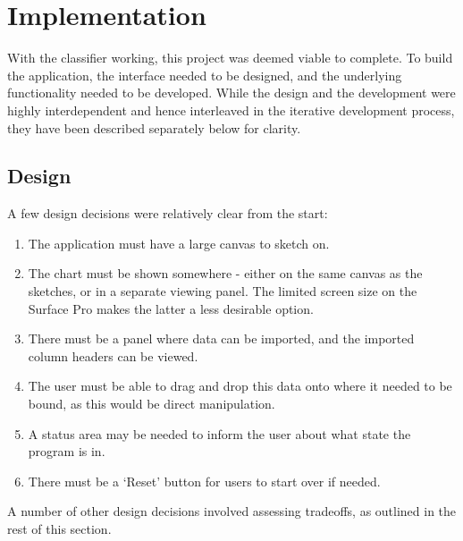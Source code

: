 \chapter{Implementation}
With the classifier working, this project was deemed viable to complete. To build the application, the interface needed to be designed, and the underlying functionality needed to be developed. While the design and the development were highly interdependent and hence interleaved in the iterative development process, they have been described separately below for clarity.

\section{Design}
\label{sec:design}
	A few design decisions were relatively clear from the start:
	\begin{enumerate}
	\item The application must have a large canvas to sketch on.
	\item The chart must be shown somewhere - either on the same canvas as the sketches, or in a separate viewing panel. The limited screen size on the Surface Pro makes the latter a less desirable option.
	\item There must be a panel where data can be imported, and the imported column headers can be viewed.
	\item The user must be able to drag and drop this data onto where it needed to be bound, as this would be direct manipulation.
	\item A status area may be needed to inform the user about what state the program is in.
	\item There must be a `Reset' button for users to start over if needed.
	\end{enumerate}
	
	A number of other design decisions involved assessing tradeoffs, as outlined in the rest of this section.	
	
